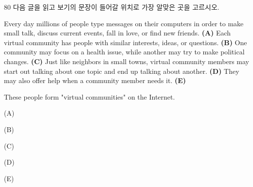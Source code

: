 \begin{question}{80}
다음 글을 읽고 보기의 문장이 들어갈 위치로 가장 알맞은 곳을 고르시오.
\begin{framedtext}
Every day millions of people type messages on their computers in order to make small talk, discuss current events, fall in love, or find new friends. \textbf{(A)} Each virtual community has people with similar interests, ideas, or questions. \textbf{(B)} One community may focus on a health issue, while another may try to make political changes. \textbf{(C)} Just like neighbors in small towns, virtual community members may start out talking about one topic and end up talking about another. \textbf{(D)} They may also offer help when a community member needs it. \textbf{(E)}
\end{framedtext}
\begin{bogi}[보기]
These people form "virtual communities" on the Internet.
\end{bogi}
\begin{choices}
  \item (A)
  \item (B)
  \item (C)
  \item (D)
  \item (E)
\end{choices}
\end{question}
